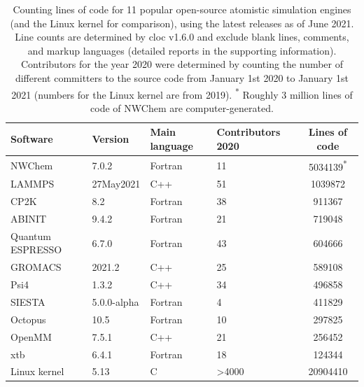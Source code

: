\documentclass[9pt,review]{livecoms}
\begin{document}


\begin{table}
    \centering
    \begin{tabular}{llllS[table-format=7.0]} \toprule
        Software & Version & Main language& {Contributors 2020} & {Lines of code} \\ \midrule
        NWChem \cite{Apra2020}&7.0.2&Fortran& 11 &5034139\textsuperscript{*} \\
        LAMMPS \cite{Plimpton1995}&27May2021&C++& 51 & 1039872  \\
        CP2K \cite{Kuhne2020a}&8.2&Fortran & 38 & 911367 \\
        ABINIT \cite{Gonze2020}&9.4.2&Fortran& 21 & 719048 \\
Quantum ESPRESSO \cite{Giannozzi2020}&6.7.0&Fortran& 43& 604666 \\
GROMACS \cite{Abraham2015}&2021.2&C++& 25 & 589108 \\
Psi4 \cite{Smith2020}&1.3.2&C++& 34 & 496858 \\
SIESTA \cite{Garcia2020}&5.0.0-alpha&Fortran& 4 & 411829 \\
Octopus \cite{Tancogne-Dejean2020}&10.5&Fortran& 10 & 297825 \\
OpenMM \cite{Eastman2017}&7.5.1&C++& 21 & 256452 \\
xtb \cite{Bannwarth2021}&6.4.1&Fortran& 18 & 124344 \\\hline
Linux kernel&5.13&C& >4000 \cite{LinuxHistory2020} & 20904410\\
    \end{tabular}\\
    \caption{
        Counting lines of code for 11 popular open-source atomistic simulation engines (and the Linux kernel for comparison), using the latest releases as of June 2021.
        Line counts are determined by cloc v1.6.0 \cite{Danial2021} and exclude blank lines, comments, and markup languages (detailed reports in the supporting information).
        Contributors for the year 2020 were determined by counting the number of different committers to the source code from January 1st 2020 to January 1st 2021 (numbers for the Linux kernel are from 2019).
        \textsuperscript{*} Roughly 3 million lines of code of NWChem are computer-generated.
    }
    \label{tab:lines-of-code}
\end{table}
\end{document}

